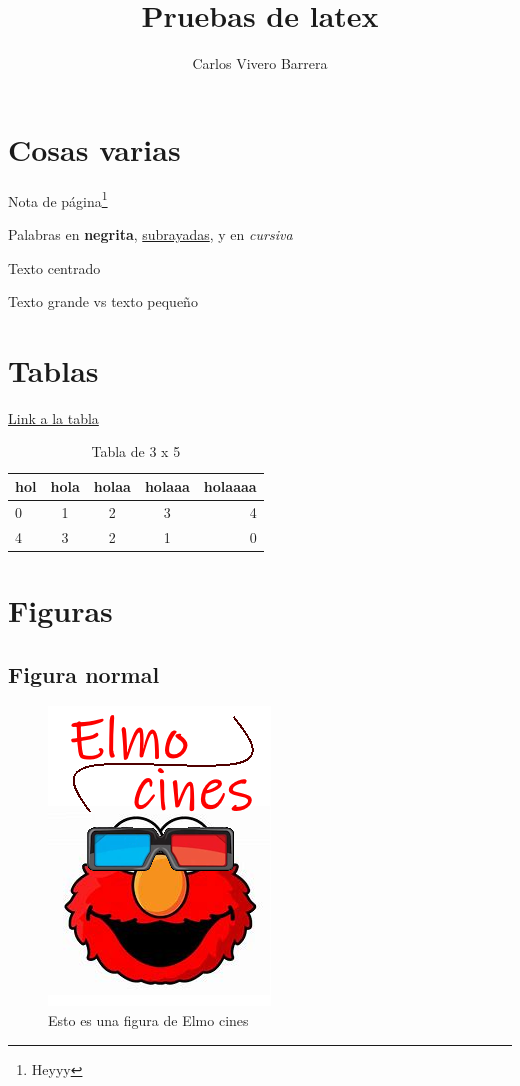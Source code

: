 \documentclass{article}
\title{Pruebas de latex}
\author{Carlos Vivero Barrera}
\begin{document}
\maketitle

\tableofcontents
\newpage

\section{Cosas varias}
    Nota de página\footnote{Heyyy}

    Palabras en \textbf{negrita}, \underline{subrayadas}, y en \textit{cursiva}
    \begin{center}
        Texto centrado
    \end{center}

    \large{Texto grande} vs \footnotesize{texto pequeño}
    \newpage

\section{Tablas}
    \hyperref[tab:Mi tabla]{Link a la tabla}
    \begin{table}[b]
        \centering
        \begin{tabular}{|l|c|c|c|r}
             hol & hola & holaa & holaaa & holaaaa \\
             \hline
             0 & 1 & 2 & 3 & 4 \\
             4 & 3 & 2 & 1 & 0 \\
             \hline
        \end{tabular}
        \caption{Tabla de 3 x 5}
        \label{tab:Mi tabla}
    \end{table}
    \newpage

\section{Figuras}
    \subsection{Figura normal}
        \begin{figure}[ht] %
            \centering
            \includegraphics[scale=0.5]{./ElmoCines.png} %
            \caption{Esto es una figura de Elmo cines}
            \label{fig:Elmo cines}
        \end{figure}
    
\end{document}
